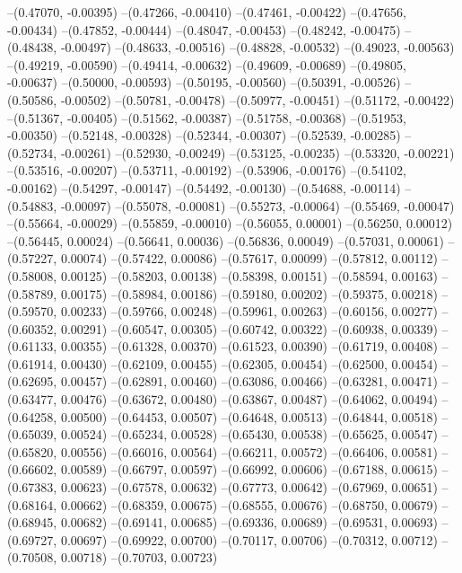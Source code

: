 --(0.47070, -0.00395)
--(0.47266, -0.00410)
--(0.47461, -0.00422)
--(0.47656, -0.00434)
--(0.47852, -0.00444)
--(0.48047, -0.00453)
--(0.48242, -0.00475)
--(0.48438, -0.00497)
--(0.48633, -0.00516)
--(0.48828, -0.00532)
--(0.49023, -0.00563)
--(0.49219, -0.00590)
--(0.49414, -0.00632)
--(0.49609, -0.00689)
--(0.49805, -0.00637)
--(0.50000, -0.00593)
--(0.50195, -0.00560)
--(0.50391, -0.00526)
--(0.50586, -0.00502)
--(0.50781, -0.00478)
--(0.50977, -0.00451)
--(0.51172, -0.00422)
--(0.51367, -0.00405)
--(0.51562, -0.00387)
--(0.51758, -0.00368)
--(0.51953, -0.00350)
--(0.52148, -0.00328)
--(0.52344, -0.00307)
--(0.52539, -0.00285)
--(0.52734, -0.00261)
--(0.52930, -0.00249)
--(0.53125, -0.00235)
--(0.53320, -0.00221)
--(0.53516, -0.00207)
--(0.53711, -0.00192)
--(0.53906, -0.00176)
--(0.54102, -0.00162)
--(0.54297, -0.00147)
--(0.54492, -0.00130)
--(0.54688, -0.00114)
--(0.54883, -0.00097)
--(0.55078, -0.00081)
--(0.55273, -0.00064)
--(0.55469, -0.00047)
--(0.55664, -0.00029)
--(0.55859, -0.00010)
--(0.56055, 0.00001)
--(0.56250, 0.00012)
--(0.56445, 0.00024)
--(0.56641, 0.00036)
--(0.56836, 0.00049)
--(0.57031, 0.00061)
--(0.57227, 0.00074)
--(0.57422, 0.00086)
--(0.57617, 0.00099)
--(0.57812, 0.00112)
--(0.58008, 0.00125)
--(0.58203, 0.00138)
--(0.58398, 0.00151)
--(0.58594, 0.00163)
--(0.58789, 0.00175)
--(0.58984, 0.00186)
--(0.59180, 0.00202)
--(0.59375, 0.00218)
--(0.59570, 0.00233)
--(0.59766, 0.00248)
--(0.59961, 0.00263)
--(0.60156, 0.00277)
--(0.60352, 0.00291)
--(0.60547, 0.00305)
--(0.60742, 0.00322)
--(0.60938, 0.00339)
--(0.61133, 0.00355)
--(0.61328, 0.00370)
--(0.61523, 0.00390)
--(0.61719, 0.00408)
--(0.61914, 0.00430)
--(0.62109, 0.00455)
--(0.62305, 0.00454)
--(0.62500, 0.00454)
--(0.62695, 0.00457)
--(0.62891, 0.00460)
--(0.63086, 0.00466)
--(0.63281, 0.00471)
--(0.63477, 0.00476)
--(0.63672, 0.00480)
--(0.63867, 0.00487)
--(0.64062, 0.00494)
--(0.64258, 0.00500)
--(0.64453, 0.00507)
--(0.64648, 0.00513)
--(0.64844, 0.00518)
--(0.65039, 0.00524)
--(0.65234, 0.00528)
--(0.65430, 0.00538)
--(0.65625, 0.00547)
--(0.65820, 0.00556)
--(0.66016, 0.00564)
--(0.66211, 0.00572)
--(0.66406, 0.00581)
--(0.66602, 0.00589)
--(0.66797, 0.00597)
--(0.66992, 0.00606)
--(0.67188, 0.00615)
--(0.67383, 0.00623)
--(0.67578, 0.00632)
--(0.67773, 0.00642)
--(0.67969, 0.00651)
--(0.68164, 0.00662)
--(0.68359, 0.00675)
--(0.68555, 0.00676)
--(0.68750, 0.00679)
--(0.68945, 0.00682)
--(0.69141, 0.00685)
--(0.69336, 0.00689)
--(0.69531, 0.00693)
--(0.69727, 0.00697)
--(0.69922, 0.00700)
--(0.70117, 0.00706)
--(0.70312, 0.00712)
--(0.70508, 0.00718)
--(0.70703, 0.00723)
